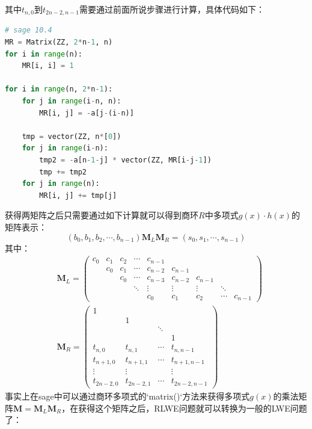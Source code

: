 \documentclass{book}
\numberwithin{equation}{subsubsection}
\begin{document}
其中$t_{n,0}$到$t_{2n-2,n-1}$需要通过前面所说步骤进行计算，具体代码如下：
\begin{lstlisting}[language=Python,basicstyle=\ttfamily,breaklines=true,keywordstyle=\bfseries\color{blue}]
# sage 10.4
MR = Matrix(ZZ, 2*n-1, n)  
for i in range(n):  
    MR[i, i] = 1
    
for i in range(n, 2*n-1):  
    for j in range(i-n, n):  
        MR[i, j] = -a[j-(i-n)]  
      
    tmp = vector(ZZ, n*[0])  
    for j in range(i-n):  
        tmp2 = -a[n-1-j] * vector(ZZ, MR[i-j-1])  
        tmp += tmp2  
    for j in range(n):  
        MR[i, j] += tmp[j]
\end{lstlisting}
获得两矩阵之后只需要通过如下计算就可以得到商环$R$中多项式$g(x)\cdot h(x)$的矩阵表示：
\begin{equation}
    (b_0,b_1,b_2,\cdots,b_{n-1})\pmb{M}_L\pmb{M}_R=(s_0,s_1,\cdots,s_{n-1})
    \nonumber
\end{equation}
其中：
\begin{equation}
    \begin{aligned}
        &\pmb{M}_L=\left(\begin{matrix}
            c_0&c_1&c_2&\cdots&c_{n-1}\\
            &c_0&c_1&\cdots&c_{n-2}&c_{n-1}\\
            &&c_0&\cdots&c_{n-3}&c_{n-2}&c_{n-1}\\
            &&&\ddots&\vdots&\vdots&\vdots&\ddots\\
            &&&&c_{0}&c_1&c_2&\cdots&c_{n-1}
        \end{matrix}\right)\\
        &\pmb{M}_R=\left(\begin{matrix}
            1&&&\\
            &1&&\\
            &&\ddots\\
            &&&1\\
            t_{n,0}&t_{n,1}&\cdots&t_{n,n-1}\\
            t_{n+1,0}&t_{n+1,1}&\cdots&t_{n+1,n-1}\\
            \vdots&\vdots&&\vdots\\
            t_{2n-2,0}&t_{2n-2,1}&\cdots&t_{2n-2,n-1}
        \end{matrix}\right)
    \end{aligned}
    \nonumber
\end{equation}
事实上在sage中可以通过商环多项式的`matrix()`方法来获得多项式$g(x)$的乘法矩阵$\pmb{M}=\pmb{M}_L\pmb{M}_R$，在获得这个矩阵之后，RLWE问题就可以转换为一般的LWE问题了：
\end{document}
